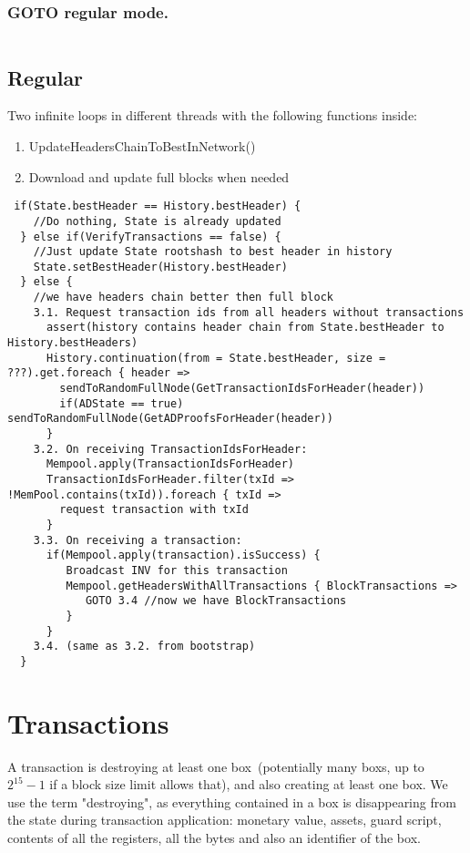 \documentclass[]{article}   %
\newcommand{\coin}{box}
\begin{document}
\subsubsection{GOTO regular mode.}
\begin{verbatim}

\end{verbatim}
\subsection{Regular}
Two infinite loops in different threads with the following functions inside:
\begin{enumerate}
\item UpdateHeadersChainToBestInNetwork()
\item Download and update full blocks when needed
\end{enumerate}
\begin{verbatim}
 if(State.bestHeader == History.bestHeader) {
    //Do nothing, State is already updated
  } else if(VerifyTransactions == false) {
    //Just update State rootshash to best header in history
    State.setBestHeader(History.bestHeader)
  } else {
    //we have headers chain better then full block         
    3.1. Request transaction ids from all headers without transactions
      assert(history contains header chain from State.bestHeader to History.bestHeaders)
      History.continuation(from = State.bestHeader, size = ???).get.foreach { header => 
        sendToRandomFullNode(GetTransactionIdsForHeader(header))
        if(ADState == true) sendToRandomFullNode(GetADProofsForHeader(header))
      }
    3.2. On receiving TransactionIdsForHeader:
      Mempool.apply(TransactionIdsForHeader)
      TransactionIdsForHeader.filter(txId => !MemPool.contains(txId)).foreach { txId => 
        request transaction with txId
      }
    3.3. On receiving a transaction:
      if(Mempool.apply(transaction).isSuccess) {
         Broadcast INV for this transaction
         Mempool.getHeadersWithAllTransactions { BlockTransactions =>
            GOTO 3.4 //now we have BlockTransactions
         }
      }
    3.4. (same as 3.2. from bootstrap)
  }
\end{verbatim}




\section{Transactions}


A transaction is destroying at least one \coin{}~(potentially many {\coin{}}s, up to $2^{15} - 1$ if a block size
limit allows that), and also creating at least one \coin{}. We use the term "destroying", as everything contained
in a \coin{} is disappearing from the state during transaction application: monetary value, assets,
guard script, contents of all the registers, all the bytes and also an identifier of the \coin{}.
\end{document}
